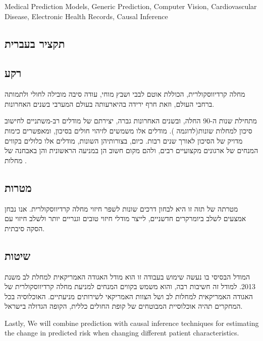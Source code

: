 \documentclass[a4paper,12pt]{article}
\begin{document}
		Medical Prediction Models, Generic Prediction, Computer Vision, Cardiovascular Disease, Electronic Health Records, Causal Inference
	
	\begin{hebrew}	
	\section{\texthebrew{תקציר בעברית}}
	
		\subsection{\texthebrew{רקע}}
		
		מחלה קרדיווסקולרית, הכוללת אוטם לבבי ושבץ מוחי, עודה סיבה מובילה לחולי ולתמותה\cite{ODonnell2016} ברחבי העולם, וזאת חרף ירידה בהיארעותה בעולם המערבי בשנים האחרונות\cite{Koton2014,Vangen-Loenne2017}.

				מתחילת שנות ה-90 החלה, ובשנים האחרונות גברה, יצירתם של מודלים רב-משתניים לחישוב סיכון למחלות שונות(לדוגמה \cite{Wilson1998,Conroy2003,DAgostino2008}). מודלים אלו משמשים לזיהוי חולים בסיכון, ומאפשרים כימות מדויק של הסיכון לאורך שנים רבות\cite{Goff2014}. כיום, בצורותיהן השונות, מודלים אלו כלולים בקווים המנחים של ארגונים מקצועיים רבים, ולהם מקום חשוב הן במניעה הראשונית והן באבחנה של מחלות \cite{Goff2014}.
				
		\subsection{\texthebrew{מטרות}}

				מטרתה של תזה זו היא לבחון דרכים שונות לשפר חיזוי מחלה קרדיווסקולרית. אנו נבחן אמצעים לשלב ביומרקרים חדשניים, לייצר מודלי חיזוי טובים וגנריים יותר ולשלב חיזוי עם הסקה סיבתית.
		
		\subsection{\texthebrew{שיטות}}
		
		המודל הבסיסי בו נעשה שימוש בעבודה זו הוא מודל האגודה האמריקאית למחלת לב משנת 2013\cite{Goff2014}. למודל זה חשיבות רבה, והוא משמש בקווים המנחים למניעת מחלה קרדיווסקולרית של האגודה האמריקאית למחלות לב ושל הצוות האמריקאי לשירותים מניעתיים\cite{Bibbins-Domingo2016}. האוכלוסיה בכל המחקרים תהיה אוכלוסיית המבוטחים של קופת החולים כללית, הקופה הגדולה בישראל.
		
		 Lastly, We will combine prediction with causal inference techniques for estimating the change in predicted risk when changing different patient characteristics.
		

\end{hebrew}
\end{document}
